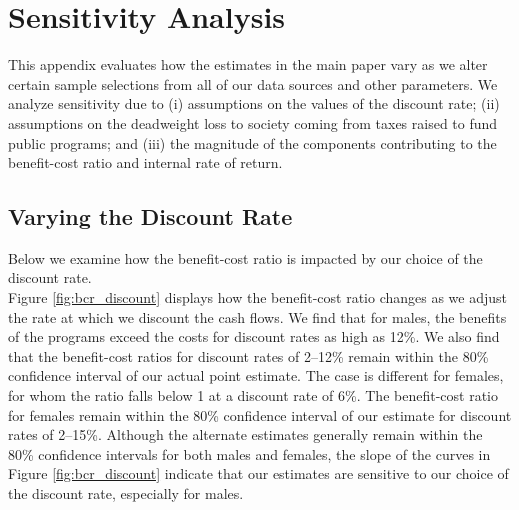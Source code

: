 \section{Sensitivity Analysis} \label{appendix:sensitivity}

\noindent This appendix evaluates how the estimates in the main paper vary as we alter certain
sample selections from all of our data sources and other parameters. We analyze sensitivity due to (i) assumptions on the values of the discount rate; (ii) assumptions on the deadweight loss to society coming from taxes raised to fund public programs; and (iii) the magnitude of the components contributing to the benefit-cost ratio and internal rate of return. \\


\subsection{Varying the Discount Rate}


\noindent Below we examine how the benefit-cost ratio is impacted by our choice of the discount rate. \\

\noindent Figure \ref{fig:bcr_discount} displays how the benefit-cost ratio changes as we adjust
the rate at which we discount the cash flows. We find that for males, the benefits of 
the programs exceed the costs for discount rates as high as 12\%. We also
find that the benefit-cost ratios for discount rates of 2--12\% remain within the 
80\% confidence interval of our actual point estimate. The case is different for females,
for whom the ratio falls below 1 at a discount rate of 6\%. The benefit-cost ratio for 
females remain within the 80\% confidence interval of our estimate for discount rates
of 2--15\%. Although the alternate estimates generally remain within the 80\%
confidence intervals for both males and females, the slope of the curves in Figure
\ref{fig:bcr_discount} indicate that our estimates are sensitive to our choice of
the discount rate, especially for males. 


